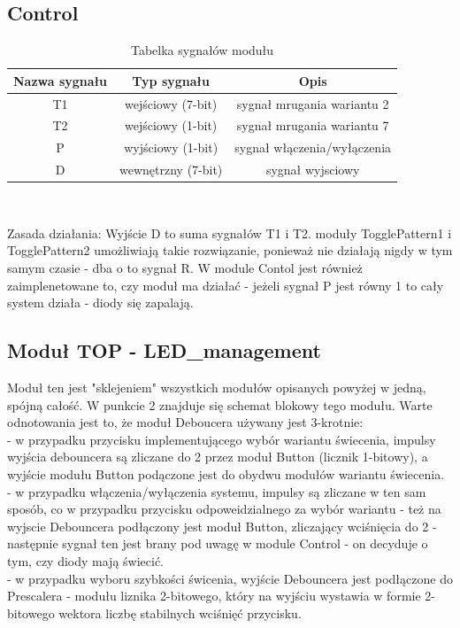 \documentclass{article}
\begin{document}
\subsection{Control}
\begin{table}[H]
    \centering
    \begin{tabular}{|c|c|c|}
        \hline
        Nazwa sygnału & Typ sygnału & Opis \\
        \hline
        T1  & wejściowy (7-bit)    & sygnał mrugania wariantu 2    \\
        \hline
        T2  & wejściowy (1-bit)   & sygnał mrugania wariantu 7    \\
        \hline
        P  & wyjściowy (1-bit)    & sygnał włączenia/wyłączenia\\
        \hline
        D  & wewnętrzny (7-bit)    & sygnał wyjsciowy\\
        \hline
    \end{tabular}\\
    \caption{Tabelka sygnałów modułu}
    \label{tab:tabela6}
\end{table}
Zasada działania: Wyjście D to suma sygnałów T1 i T2. moduły TogglePattern1 i TogglePattern2 umożliwiają takie rozwiązanie, ponieważ nie działają nigdy w tym samym czasie - 
dba o to sygnał R. W module Contol jest również zaimplenetowane to, czy moduł ma działać - jeżeli sygnał P jest równy 1 to cały system działa - diody się zapalają.
\subsection{Moduł TOP - LED\_management}
Moduł ten jest "sklejeniem" wszystkich modułów opisanych powyżej w jedną, spójną całość. W punkcie 2 znajduje się schemat blokowy tego modułu. Warte odnotowania jest to, że moduł 
Deboucera używany jest 3-krotnie: \\
- w przypadku przycisku implementującego wybór wariantu świecenia, impulsy wyjścia debouncera są zliczane do 2 przez moduł Button (licznik 1-bitowy), a wyjście modułu Button podączone jest do
obydwu modułów wariantu świecenia. \\
- w przypadku włączenia/wyłączenia systemu, impulsy są zliczane w ten sam sposób, co w przypadku przycisku odpoweidzialnego za wybór wariantu - też na wyjscie Debouncera
podłączony jest moduł Button, zliczający wciśnięcia do 2 - następnie sygnał ten jest brany pod uwagę w module Control - on decyduje o tym, czy diody mają świecić. \\
- w przypadku wyboru szybkości świcenia, wyjście Debouncera jest podłączone do Prescalera - modułu liznika 2-bitowego, który na wyjściu wystawia w formie 2-bitowego wektora liczbę stabilnych 
wciśnięć przycisku.
\end{document}
